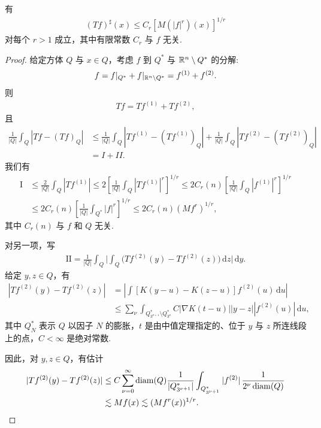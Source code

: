 \begin{theorem}\label{thm:4.20}
有
\begin{align*}
  (T f)^{\sharp}(x)\leq C_{r}\left[M(|f|^{r})(x)\right]^{1/r}
\end{align*}
对每个 $r > 1$ 成立，其中有限常数 $C_{r}$ 与 $f$ 无关.
\end{theorem}

\begin{proof}
给定方体 $Q$ 与 $x \in Q$，考虑 $f$ 到 $Q^*$ 与 $\mathbb{R}^n \setminus Q^*$ 的分解:
\begin{align*}
  f=f|_{Q^{*}}+f|_{\mathbb{R}^{n}\setminus Q^{*}}=f^{(1)}+f^{(2)}.
\end{align*}
则
\begin{align*}
  T f=T f^{\left(1\right)}+T f^{\left(2\right)},
\end{align*}
且
\begin{align*}
  \frac{1}{\left|Q\right|}\int_{Q}\left|Tf-(Tf)_{Q}\right|
  &\leq\frac{1}{\left|Q\right|}\int_{Q}\left|Tf^{(1)}-(Tf^{(1)})_{Q}\right|
   +\frac{1}{\left|Q\right|}\int_{Q}\left|Tf^{(2)}-(Tf^{(2)})_{Q}\right|\\
  &=I+II.
\end{align*}
我们有
\begin{align*}
  \mathrm{I}
  &\leq\frac{2}{|Q|}\int_{Q}|Tf^{(1)}|
  \leq 2\left[\frac{1}{|Q|}\int_{Q}|Tf^{(1)}|^{r}\right]^{1/r}
  \leq 2C_{r}(n)\left[\frac{1}{|Q|}\int_{Q}|f^{(1)}|^{r}\right]^{1/r}\\
  &\leq 2C_{r}(n)\left[\frac{1}{|Q|}\int_{Q^{*}}|f|^{r}\right]^{1/r}
  \leq 2C_{r}(n)\left(Mf^{r}\right)^{1/r},
\end{align*}
其中 $C_{r}(n)$ 与 $f$ 和 $Q$ 无关.

对另一项，写
\begin{align*}
  \mathrm{II}=\frac{1}{\left|Q\right|}\int_{Q}\Big|\int_{Q}\bigl(T f^{(2)}(y)-T f^{(2)}(z)\bigr)\,\mathrm{d}z\Big|\,\mathrm{d}y.
\end{align*}
给定 $y, z \in Q$，有
\begin{align*}
  \left|Tf^{(2)}(y)-Tf^{(2)}(z)\right|
  &=\left|\int\left[K(y-u)-K(z-u)\right]f^{(2)}(u)\,\mathrm{d}u\right|\\
  &\leq\sum_{\nu}\int_{Q_{3^{\nu+1}}^{*}\setminus Q_{3^{\nu}}^{*}}
   C\left|\nabla K(t-u)\right|\left|y-z\right|\left|f^{(2)}(u)\right|\,\mathrm{d}u,
\end{align*}
其中 $Q_N^*$ 表示 $Q$ 以因子 $N$ 的膨胀，$t$ 是由中值定理指定的、位于 $y$ 与 $z$ 所连线段上的点，$C < \infty$ 是绝对常数.

因此，对 $y, z \in Q$，有估计
\begin{align*}
  |Tf^{(2)}(y)-Tf^{(2)}(z)|
  &\leq C\sum_{\nu=0}^{\infty}\operatorname{diam}(Q)\frac{1}{|Q_{3^{\nu+1}}^{*}|}
   \int_{Q_{3^{\nu+1}}^{*}}|f^{(2)}|\,\frac{1}{2^{\nu}\operatorname{diam}(Q)}\\
  &\lesssim Mf(x)\lesssim(Mf^{r}(x))^{1/r}.
\end{align*}
\end{proof}

